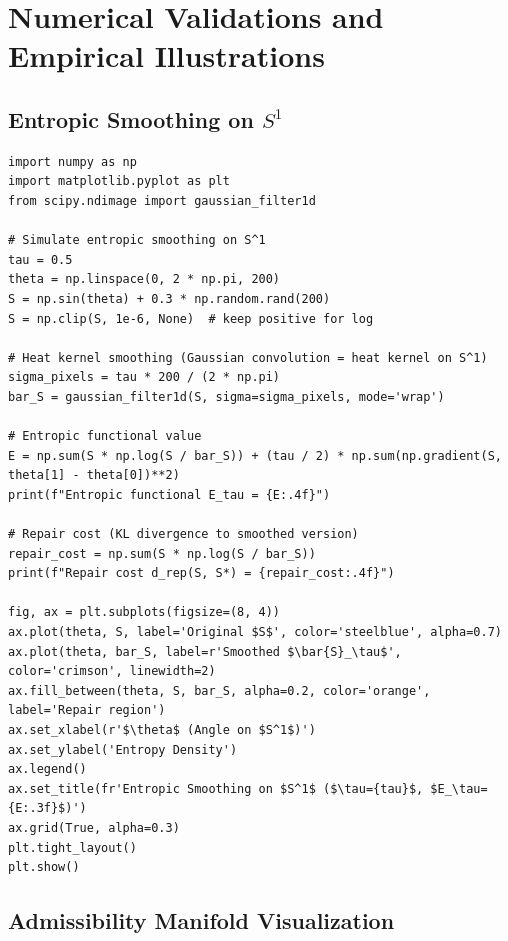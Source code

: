 \documentclass[a4paper,12pt]{article}
\theoremstyle{definition}
\begin{document}
\section{Numerical Validations and Empirical Illustrations}
\label{sec:numerical}

\subsection{Entropic Smoothing on $S^1$}

\begin{lstlisting}
import numpy as np
import matplotlib.pyplot as plt
from scipy.ndimage import gaussian_filter1d

# Simulate entropic smoothing on S^1
tau = 0.5
theta = np.linspace(0, 2 * np.pi, 200)
S = np.sin(theta) + 0.3 * np.random.rand(200)
S = np.clip(S, 1e-6, None)  # keep positive for log

# Heat kernel smoothing (Gaussian convolution = heat kernel on S^1)
sigma_pixels = tau * 200 / (2 * np.pi)
bar_S = gaussian_filter1d(S, sigma=sigma_pixels, mode='wrap')

# Entropic functional value
E = np.sum(S * np.log(S / bar_S)) + (tau / 2) * np.sum(np.gradient(S, theta[1] - theta[0])**2)
print(f"Entropic functional E_tau = {E:.4f}")

# Repair cost (KL divergence to smoothed version)
repair_cost = np.sum(S * np.log(S / bar_S))
print(f"Repair cost d_rep(S, S*) = {repair_cost:.4f}")

fig, ax = plt.subplots(figsize=(8, 4))
ax.plot(theta, S, label='Original $S$', color='steelblue', alpha=0.7)
ax.plot(theta, bar_S, label=r'Smoothed $\bar{S}_\tau$', color='crimson', linewidth=2)
ax.fill_between(theta, S, bar_S, alpha=0.2, color='orange', label='Repair region')
ax.set_xlabel(r'$\theta$ (Angle on $S^1$)')
ax.set_ylabel('Entropy Density')
ax.legend()
ax.set_title(fr'Entropic Smoothing on $S^1$ ($\tau={tau}$, $E_\tau={E:.3f}$)')
ax.grid(True, alpha=0.3)
plt.tight_layout()
plt.show()
\end{lstlisting}

\subsection{Admissibility Manifold Visualization}
\end{document}
